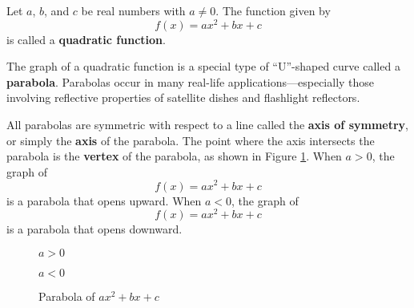 \begin{definition}
    Let $a$, $b$, and $c$ be real numbers with $a \neq 0$. The function given by $$f(x)=ax^2+bx+c$$
    is called a \textbf{quadratic function}.
    \\ \cite{ci}
\end{definition}

The graph of a quadratic function is a special type of “U”-shaped curve called a \textbf{parabola}. Parabolas occur in many real-life applications—especially those involving reflective properties of satellite dishes and flashlight reflectors.

All parabolas are symmetric with respect to a line called the \textbf{axis of symmetry}, or simply the \textbf{axis} of the parabola. The point where the axis intersects the parabola is the \textbf{vertex} of the parabola, as shown in Figure \ref{plot:quat func bas}. When $a > 0$, the graph of
$$f(x)=ax^2+bx+c$$
is a parabola that opens upward. When $a < 0$, the graph of
$$f(x)=ax^2+bx+c$$
is a parabola that opens downward. \cite{ci}

\begin{figure}[H]
    \centering
    \begin{multicols}{2}
    $a > 0$
    $a < 0$
\end{multicols}
    \caption{Parabola of $ax^2+bx+c$}
    \label{plot:quat func bas}
\end{figure}

